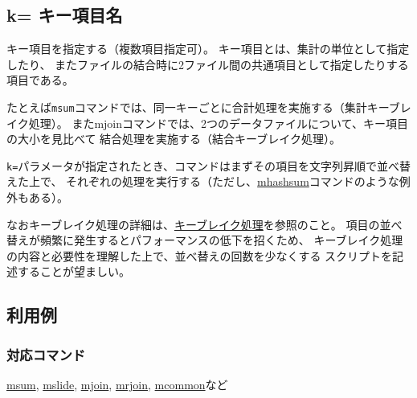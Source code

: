 
%

\subsection{k= キー項目名\label{sect:option_k}}



キー項目を指定する（複数項目指定可）。
キー項目とは、集計の単位として指定したり、
またファイルの結合時に2ファイル間の共通項目として指定したりする項目である。

たとえば\verb|msum|コマンドでは、同一キーごとに合計処理を実施する（集計キーブレイク処理）。
またmjoinコマンドでは、2つのデータファイルについて、キー項目の大小を見比べて
結合処理を実施する（結合キーブレイク処理）。

\verb|k=|パラメータが指定されたとき、コマンドはまずその項目を文字列昇順で並べ替えた上で、
それぞれの処理を実行する（ただし、\hyperref[sect:mhashsum]{mhashsum}コマンドのような例外もある）。

なおキーブレイク処理の詳細は、\hyperref[sect:keybreak]{キーブレイク処理}を参照のこと。
項目の並べ替えが頻繁に発生するとパフォーマンスの低下を招くため、
キーブレイク処理の内容と必要性を理解した上で、並べ替えの回数を少なくする
スクリプトを記述することが望ましい。

\subsection*{利用例}


\subsubsection*{対応コマンド}
\hyperref[sect:msum]{msum},
\hyperref[sect:mslide]{mslide},
\hyperref[sect:mjoin]{mjoin},
\hyperref[sect:mrjoin]{mrjoin},
\hyperref[sect:mcommon]{mcommon}など

%


